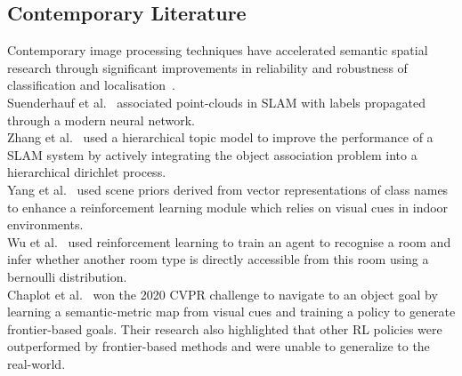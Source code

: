 \documentclass[twocolumn,letterpaper]{IEEEAerospaceCLS}  %
\begin{document}
\subsection{Contemporary Literature}
Contemporary image processing techniques have accelerated semantic spatial research through significant improvements in reliability and robustness of classification and localisation~\cite{alom_history_2018}.\\
Suenderhauf et al.~\cite{sunderhauf_meaningful_2017} associated point-clouds in SLAM with labels propagated through a modern neural network.\\
Zhang et al.~\cite{zhang_hierarchical_2019} used a hierarchical topic model to improve the performance of a SLAM system by actively integrating the object association problem into a hierarchical dirichlet process.\\
Yang et al.~\cite{yang_visual_2018} used scene priors derived from vector representations of class names to enhance a reinforcement learning module which relies on visual cues in indoor environments.\\
Wu et al.~\cite{wu_learning_2018} used reinforcement learning to train an agent to recognise a room and infer whether another room type is directly accessible from this room using a bernoulli distribution.\\
Chaplot et al.~\cite{chaplot_object_2020} won the 2020 CVPR challenge to navigate to an object goal by learning a semantic-metric map from visual cues and training a policy to generate frontier-based goals. Their research also highlighted that other RL policies were outperformed by frontier-based methods and were unable to generalize to the real-world.\\ 
\end{document}
